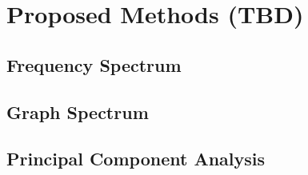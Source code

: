 
\chapter{Proposed Methods (TBD)}

\section{Frequency Spectrum}

\section{Graph Spectrum}

\section{Principal Component Analysis}


